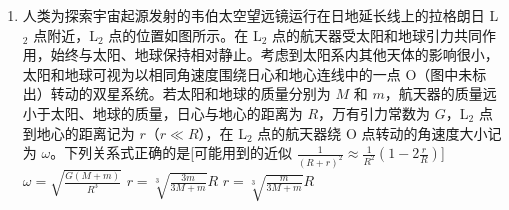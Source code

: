 \documentclass[\gkver]{gaokaozhenti}
\begin{document}
\begin{enumerate}
{则可知乙车在 $t$ = 2 $\Us$和 $t$ = 6 $\Us$ 时的速度相同，故 B 正确；

C．根据图（a）可知，2 \textasciitilde{} 6 $\Us$ 内甲车的位移为 0；根据图（b）可知，2 \textasciitilde{} 6 $\Us$ 内乙车一直向正方向运动，则 2 \textasciitilde{} 6 $\Us$ 内，甲、乙两车的位移不同，故 C 正确；

D．根据图（a）可知，$t$ = 8 $\Us$ 时甲车的速度为 0，则 $t$ = 8 $\Us$ 时，甲车的动能为 0；乙车在 0 \textasciitilde{} 8 $\Us$ 内根据动量定理有

$I_{8} = mv_{8}$，$I_{8} = S_{0 ~ 8}$ = 0

可知 $t$ = 8 $\Us$ 时乙车的速度为 0，则 $t$ = 8 $\Us$ 时，乙车的动能为 0，故 D 错误。

故选 BC。
}

\item
人类为探索宇宙起源发射的韦伯太空望远镜运行在日地延长线上的拉格朗日 L$_{2}$ 点附近，L$_{2}$ 点的位置如图所示。在 L$_{2}$ 点的航天器受太阳和地球引力共同作用，始终与太阳、地球保持相对静止。考虑到太阳系内其他天体的影响很小，太阳和地球可视为以相同角速度围绕日心和地心连线中的一点 O（图中未标出）转动的双星系统。若太阳和地球的质量分别为 $M$ 和 $m$，航天器的质量远小于太阳、地球的质量，日心与地心的距离为 $R$，万有引力常数为 $G$，L$_{2}$ 点到地心的距离记为 $r$（$r \ll R$），在 L$_{2}$ 点的航天器绕 O 点转动的角速度大小记为 $\omega$。下列关系式正确的是[可能用到的近似 $\frac{1}{{{{(R + r)}^2}}} \approx \frac{1}{{{R^2}}}\left( {1 - 2\frac{r}{R}} \right)$]
{$\omega = \sqrt {\frac{{G(M + m)}}{{{R^3}}}} $}
{$r = \sqrt[3]{{\frac{{3m}}{{3M + m}}}} R$}
{$r = \sqrt[3]{{\frac{{m}}{{3M + m}}}} R$}
\end{enumerate}
\end{document}
